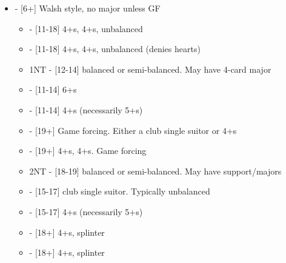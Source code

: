 \documentclass[12pt]{report}
\newcommand{\ul}[1]{\begin{itemize}#1\end{itemize}}
\newcommand{\li}{\item[~]}
\begin{document}
    \ul {
        \li {} - [6+] Walsh style, no major unless GF
        \ul {
            \li \he1 - [11-18] 4+\cl{}s, 4+\he{}s, unbalanced
            \li \sp1 - [11-18] 4+\cl{}s, 4+\sp{}s, unbalanced (denies hearts)
            \li 1NT - [12-14] balanced or semi-balanced.  May have 4-card major
            \li \cl2 - [11-14] 6+\cl{}s
            \li \di2 - [11-14] 4+\di{}s (necessarily 5+\cl{}s)
            \li \he2 - [19+] Game forcing.  Either a club single suitor or 4+\he{}s
            \li \sp2 - [19+] 4+\cl{}s, 4+\sp{}s.  Game forcing
            \li 2NT - [18-19] balanced or semi-balanced.  May have support/majors
            \li \cl3 - [15-17] club single suitor.  Typically unbalanced
            \li \di3 - [15-17] 4+\di{}s (necessarily 5+\cl{}s)
            \li \he3 - [18+] 4+\di{}s, splinter
            \li \sp3 - [18+] 4+\di{}s, splinter
        }

}
\end{document}
